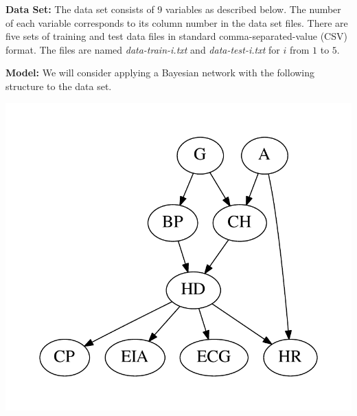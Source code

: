 \documentclass[11pt]{article}
\begin{document}
\textbf{Data Set:} The data set consists of 9 variables as described below. The number of each variable corresponds to its column number in the data set files. There are five sets of training and test data files in standard comma-separated-value (CSV) format. The files are named \textit{data-train-i.txt} and \textit{data-test-i.txt} for $i$ from $1$ to $5$.\\

\begin{center}
\end{center}

\textbf{Model: } We will consider applying a Bayesian network with the following structure to the data set.\\

\begin{center}
    \includegraphics[scale=0.5,trim=10mm 10mm 10mm 10mm,clip]{bn.pdf}
\end{center}
\end{document}
